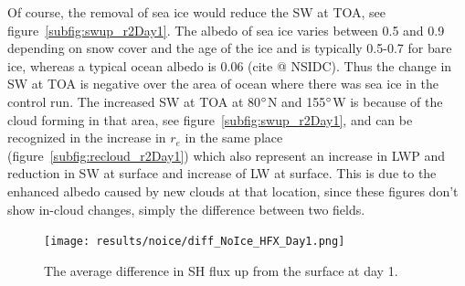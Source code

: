 
Of course, the removal of sea ice would reduce the SW at TOA, see figure~\ref{subfig:swup_r2Day1}. The albedo of sea ice varies between 0.5 and 0.9 depending on snow cover and the age of the ice and is typically 0.5-0.7 for bare ice, whereas a typical ocean albedo is 0.06 (cite @ NSIDC). Thus the change in SW at TOA is negative over the area of ocean where there was sea ice in the control run. The increased SW at TOA at 80$\degree$N and 155$\degree$W is because of the cloud forming in that area, see figure~\ref{subfig:swup_r2Day1}, and can be recognized in the increase in $r_e$ in the same place (figure~\ref{subfig:recloud_r2Day1}) which also represent an increase in LWP and reduction in SW at surface and increase of LW at surface. This is due to the enhanced albedo caused by new clouds at that location, since these figures don't show in-cloud changes, simply the difference between two fields.

\begin{figure}
\centering
\texttt{[image: results/noice/diff\_NoIce\_HFX\_Day1.png]}
\caption{The average difference in SH flux up from the surface at day 1.}
\label{fig:sh_r2Day1}
\end{figure}

